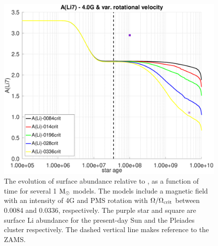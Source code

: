 \documentclass[fleqn,usenatbib]{mnras}
\begin{document}
\begin{figure}
	\includegraphics[trim = 25mm 10mm 15mm 10mm, clip,width=\columnwidth]{figures/li_var_vel_4_0g.eps}
    \caption{The evolution of surface  abundance relative to , as a function of time for several 1 $\mathrm{M}_\odot$ models. The models include a magnetic field with an intensity of 4G and PMS rotation with $\Omega / \Omega_{\mathrm{crit}}$ between 0.0084 and 0.0336, respectively. The purple star and square are surface Li abundance for the present-day Sun \citep{Asplund2009} and the Pleiades cluster \citep{Sestito2005} respectively. The dashed vertical line makes reference to the ZAMS.}
    \label{fig:li_var_vel_4_0g}
\end{figure}
\end{document}
